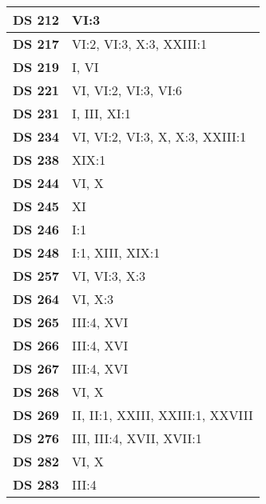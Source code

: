 \begin{xltabular}{\linewidth}{ l | X }
    \textbf {DS 212} & VI:3 \\ \hline

    \textbf {DS 217} & VI:2, VI:3, X:3, XXIII:1 \\ \hline

    \textbf {DS 219} & I, VI \\ \hline

    \textbf {DS 221} & VI, VI:2, VI:3, VI:6 \\ \hline

    \textbf {DS 231} & I, III, XI:1 \\ \hline

    \textbf {DS 234} & VI, VI:2, VI:3, X, X:3, XXIII:1 \\ \hline

    \textbf {DS 238} & XIX:1 \\ \hline

    \textbf {DS 244} & VI, X \\ \hline

    \textbf {DS 245} & XI \\ \hline

    \textbf {DS 246} & I:1 \\ \hline

    \textbf {DS 248} & I:1, XIII, XIX:1 \\ \hline

    \textbf {DS 257} & VI, VI:3, X:3 \\ \hline

    \textbf {DS 264} & VI, X:3 \\ \hline

    \textbf {DS 265} & III:4, XVI \\ \hline

    \textbf {DS 266} & III:4, XVI \\ \hline

    \textbf {DS 267} & III:4, XVI \\ \hline

    \textbf {DS 268} & VI, X \\ \hline

    \textbf {DS 269} & II, II:1, XXIII, XXIII:1, XXVIII \\ \hline

    \textbf {DS 276} & III, III:4, XVII, XVII:1 \\ \hline

    \textbf {DS 282} & VI, X \\ \hline

    \textbf {DS 283} & III:4 \\ \hline


\end{xltabular}
